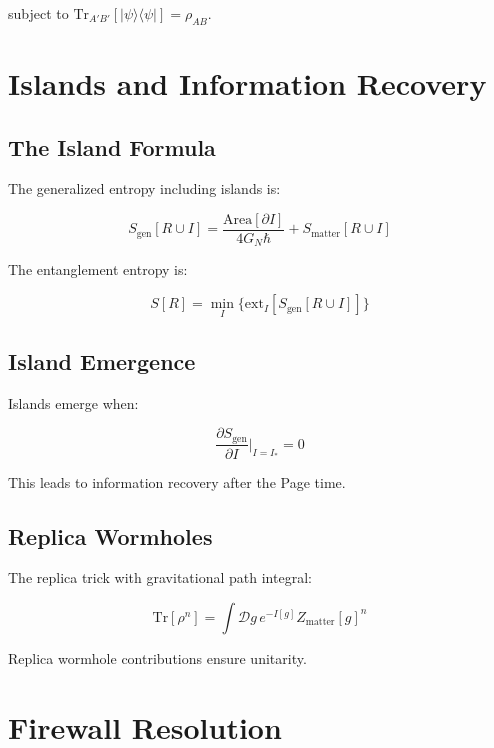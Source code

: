 \documentclass[12pt,a4paper]{article}
\begin{document}
subject to $\text{Tr}_{A'B'}[|\psi\rangle\langle\psi|] = \rho_{AB}$.

\section{Islands and Information Recovery}

\subsection{The Island Formula}

The generalized entropy including islands is:

\begin{equation}
S_{\text{gen}}[R \cup I] = \frac{\text{Area}[\partial I]}{4G_N\hbar} + S_{\text{matter}}[R \cup I]
\end{equation}

The entanglement entropy is:

\begin{equation}
S[R] = \min_I \{\text{ext}_I[S_{\text{gen}}[R \cup I]]\}
\end{equation}

\subsection{Island Emergence}

Islands emerge when:

\begin{equation}
\frac{\partial S_{\text{gen}}}{\partial I}\bigg|_{I=I_*} = 0
\end{equation}

This leads to information recovery after the Page time.

\subsection{Replica Wormholes}

The replica trick with gravitational path integral:

\begin{equation}
\text{Tr}[\rho^n] = \int \mathcal{D}g \, e^{-I[g]} Z_{\text{matter}}[g]^n
\end{equation}

Replica wormhole contributions ensure unitarity.

\section{Firewall Resolution}
\end{document}
